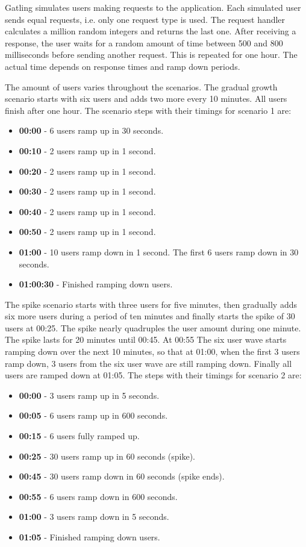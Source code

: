 \documentclass[english]{tktltiki2}
\theoremstyle{definition}
\theoremstyle{remark}
\begin{document}
Gatling simulates users making requests to the application. Each simulated user
sends equal requests, i.e. only one request type is used. The request handler
calculates a million random integers and returns the last one. After receiving a
response, the user waits for a random amount of time between 500 and 800
milliseconds before sending another request. This is repeated for one hour. The
actual time depends on response times and ramp down periods.

The amount of users varies throughout the scenarios. The gradual growth scenario
starts with six users and adds two more every 10 minutes. All users finish after
one hour. The scenario steps with their timings for scenario 1 are:

\begin{itemize}
	\item{\textbf{00:00} - 6 users ramp up in 30 seconds.}
	\item{\textbf{00:10} - 2 users ramp up in 1 second.}
	\item{\textbf{00:20} - 2 users ramp up in 1 second.}
	\item{\textbf{00:30} - 2 users ramp up in 1 second.}
	\item{\textbf{00:40} - 2 users ramp up in 1 second.}
	\item{\textbf{00:50} - 2 users ramp up in 1 second.}
	\item{\textbf{01:00} - 10 users ramp down in 1 second. The first 6 users ramp 
			down in 30 seconds.}	
	\item{\textbf{01:00:30} - Finished ramping down users.}
	\label{gatlingStepsScenario1}
\end{itemize}

The spike scenario starts with three users for five minutes, then gradually adds
six more users during a period of ten minutes and finally starts the spike of 30
users at 00:25. The spike nearly quadruples the user amount during one minute. The
spike lasts for 20 minutes until 00:45. At 00:55 The six user wave starts
ramping down over the next 10 minutes, so that at 01:00, when the first 3 users
ramp down, 3 users from the six user wave are still ramping down. Finally all
users are ramped down at 01:05. The steps with their timings for scenario 2 are:

\begin{itemize}
	\item{\textbf{00:00} - 3 users ramp up in 5 seconds.}
	\item{\textbf{00:05} - 6 users ramp up in 600 seconds.}
	\item{\textbf{00:15} - 6 users fully ramped up.}
	\item{\textbf{00:25} - 30 users ramp up in 60 seconds (spike).}
	\item{\textbf{00:45} - 30 users ramp down in 60 seconds (spike ends).}
	\item{\textbf{00:55} - 6 users ramp down in 600 seconds.}
	\item{\textbf{01:00} - 3 users ramp down in 5 seconds.}
	\item{\textbf{01:05} - Finished ramping down users.}	
	\label{gatlingStepsScenario2}
\end{itemize}
\end{document}
